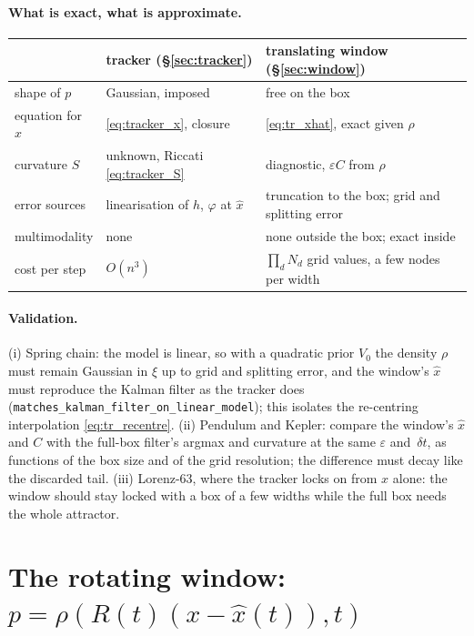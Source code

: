 \documentclass[11pt,a4paper]{article}
\newcommand{\xh}{\hat{x}}
\newcommand{\eps}{\varepsilon}
\newcommand{\dt}{\,\delta t}
\theoremstyle{plain}
\theoremstyle{definition}
\theoremstyle{remark}
\begin{document}
\paragraph{What is exact, what is approximate.}
\begin{center}\small
\begin{tabular}{@{}lll@{}}
\toprule
 & tracker (\S\ref{sec:tracker}) & translating window (\S\ref{sec:window}) \\
\midrule
shape of $p$ & Gaussian, imposed & free on the box \\
equation for $\xh$ & \eqref{eq:tracker_x}, closure & \eqref{eq:tr_xhat}, exact given $\rho$ \\
curvature $S$ & unknown, Riccati \eqref{eq:tracker_S} & diagnostic, $\eps C$ from $\rho$ \\
error sources & linearisation of $h$, $\varphi$ at $\xh$ & truncation to the box; grid and splitting error \\
multimodality & none & none outside the box; exact inside \\
cost per step & $O(n^3)$ & $\prod_dN_d$ grid values, a few nodes per width \\
\bottomrule
\end{tabular}
\end{center}

\paragraph{Validation.}
(i) Spring chain: the model is linear, so with a quadratic prior $V_0$ the density $\rho$ must remain Gaussian in $\xi$ up to grid and splitting error, and the window's $\xh$ must reproduce the Kalman filter as the tracker does (\texttt{matches\_kalman\_filter\_on\_linear\_model}); this isolates the re-centring interpolation \eqref{eq:tr_recentre}. (ii) Pendulum and Kepler: compare the window's $\xh$ and $C$ with the full-box filter's argmax and curvature at the same $\eps$ and $\dt$, as functions of the box size and of the grid resolution; the difference must decay like the discarded tail. (iii) Lorenz-63, where the tracker locks on from $x$ alone: the window should stay locked with a box of a few widths while the full box needs the whole attractor.

\section{The rotating window: \texorpdfstring{$p=\rho(R(t)(x-\xh(t)),t)$}{p = rho(R(t)(x - xhat(t)), t)}}
\label{sec:rot}
\end{document}
